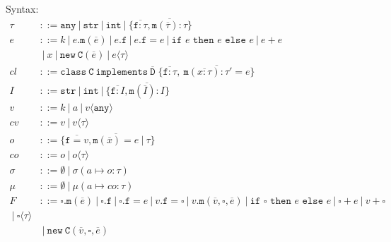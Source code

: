 \documentclass{report}
\begin{document}
\newcommand{\class}{\ensuremath{\xt{class}}\xspace}
\newcommand{\G}{\Gamma}
\renewcommand{\int}{\texttt{int}}
\newcommand{\coerce}{\Rightarrow} %
\newcommand{\str}{\texttt{str}}
\newcommand{\any}{\texttt{any}}   %
\newcommand{\this}{\texttt{this}}
\newcommand{\ifthenelse}[3]{\texttt{if }#1\texttt{ then }#2\texttt{ else }#3}
\newcommand{\cast}[1]{\langle #1\rangle} 
\newcommand{\xt}[1]{\texttt{#1}}
\newcommand{\creduce}{\longrightarrow_{cr}}  %
\newcommand{\ereduce}{\longrightarrow_{e}}   %
\newcommand{\stepsto}{\longrightarrow}        %
\newcommand{\intv}[1]{\xt{int}[#1]}
\newcommand{\strv}[1]{\xt{str}[#1]}
\newcommand{\tlate}{\rightsquigarrow}
\newcommand{\s}{\sigma}
\renewcommand{\sc}{\mu}
\renewcommand{\t}{\tau}
\newcommand{\B}{\ensuremath{~|~}\xspace}
\newcommand{\new}{\ensuremath{\texttt{new}}\xspace}
\newcommand{\NEW}[2]{\ensuremath{  \new ~ #1 ( #2 )}\xspace}
\renewcommand{\bar}[1]{\ensuremath{\overline{ #1} }\xspace}
\newcommand{\m}{\ensuremath{\xt{m}}\xspace}
\newcommand{\f}{\ensuremath{\xt{f}}\xspace}
\newcommand{\C}{\ensuremath{\xt{C}}\xspace}
\newcommand{\D}{\ensuremath{\xt{D}}\xspace}
\newcommand{\is}{\mapsto}
\newcommand{\cl}{\mathit{cl}\xspace}
\newcommand{\implements}{\xt{implements}\xspace}
\newcommand{\CLASS}[3]{ \ensuremath{  \xt{class}~#1~\implements~#2\;\{ #3 \}}\xspace} 
\newcommand{\MDEF}[4] { #1( #2 ):#3 = #4}
\newcommand{\MTYPE}[3] { #1( #2 ):#3}
\newcommand{\MVAL}[3] { #1( #2 ) = #3}
\newcommand{\Gdash}{\G\vdash}



Syntax:
\begin{align*}
\t &::= \any \B  \str \B  \int \B  \{\bar{\f :\t},\bar{\m (\bar{\t}):\t}\}\\
e &::= k \B  e.\m(\bar{e}) \B e.\f  \B e.\f  = e \B  \ifthenelse{e}{e}{e}\B e + e \\
&\B x\B \NEW \C {\bar{e}} \B  e\cast{\t}\\
\cl &::= \CLASS \C {\bar \D} { \bar{ \f : \t }, ~ \bar{ \MDEF{\m}{\bar{x :\t}}{\t'}{e} } } \\
I &::= \str \B  \int \B  \{\bar{\f :I},\bar{\m (\bar{I}):I}\}\\
v &::= k \B a \B  v\cast{\any}\\
cv &::= v \B  v\cast{\t}\\
\mathit{o} &::= \{\bar{\f=v}, \bar{\m(\bar x) = e} \B \t\}\\
\mathit{co} &::= o \B o\cast{\t}\\
\s &::= \emptyset \B  \s( a \is o : \t )\\
\sc &::= \emptyset \B  \sc( a \is  co : \t )\\
F &::=    \square.\m(\bar e) 
   \B 	  \square.\f 
   \B 	  \square.\f  = e
   \B     v.\f  = \square
   \B     v.\m(\bar v,\square, \bar e) 
   \B     \ifthenelse{\square}{e}{e} 
   \B     \square + e 
   \B      v + \square\\
   \B     \square\cast{\tau}\\
&\B \NEW  \C {\bar{v},\square,\bar{e}}\\
\end{align*}
\end{document}
